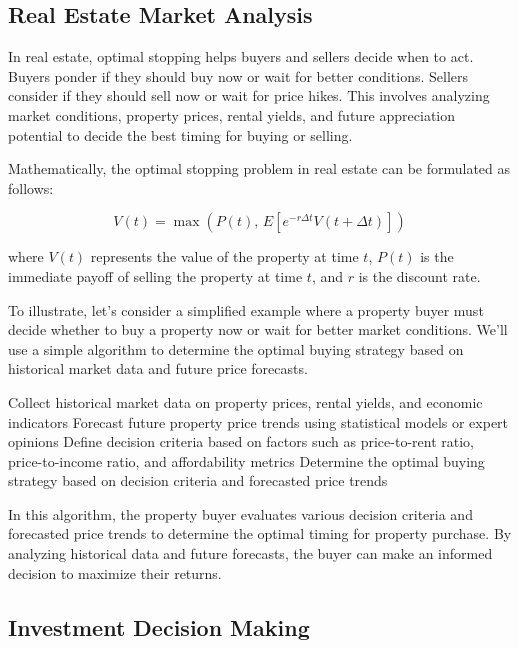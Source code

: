 \documentclass[12pt]{book} %
\begin{document}
\subsection{Real Estate Market Analysis}

In real estate, optimal stopping helps buyers and sellers decide when to act. Buyers ponder if they should buy now or wait for better conditions. Sellers consider if they should sell now or wait for price hikes. This involves analyzing market conditions, property prices, rental yields, and future appreciation potential to decide the best timing for buying or selling.


Mathematically, the optimal stopping problem in real estate can be formulated as follows:

\[
V(t) = \max \left( P(t), \, E \left[ e^{-r\Delta t}V(t + \Delta t) \right] \right)
\]

where \(V(t)\) represents the value of the property at time \(t\), \(P(t)\) is the immediate payoff of selling the property at time \(t\), and \(r\) is the discount rate.

To illustrate, let's consider a simplified example where a property buyer must decide whether to buy a property now or wait for better market conditions. We'll use a simple algorithm to determine the optimal buying strategy based on historical market data and future price forecasts.

\FloatBarrier
\begin{algorithm}
\caption{Optimal Property Buying Strategy}
\begin{algorithmic}[1]
\State Collect historical market data on property prices, rental yields, and economic indicators
\State Forecast future property price trends using statistical models or expert opinions
\State Define decision criteria based on factors such as price-to-rent ratio, price-to-income ratio, and affordability metrics
\State Determine the optimal buying strategy based on decision criteria and forecasted price trends
\end{algorithmic}
\end{algorithm}
\FloatBarrier

In this algorithm, the property buyer evaluates various decision criteria and forecasted price trends to determine the optimal timing for property purchase. By analyzing historical data and future forecasts, the buyer can make an informed decision to maximize their returns.

\subsection{Investment Decision Making}
\end{document}

